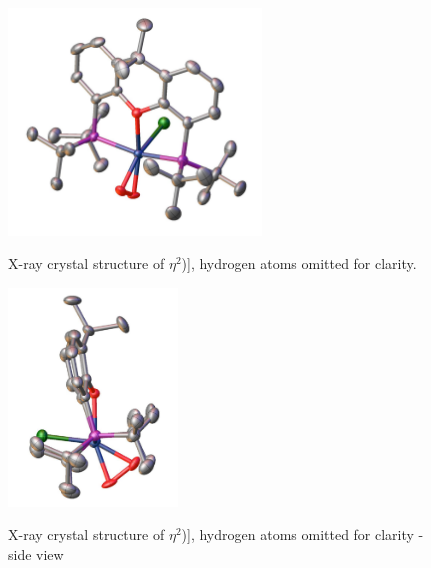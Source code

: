 \begin{figure}[htp]
\begin{center}
\vspace{0.5cm}
\includegraphics[width=0.6\textwidth]{../Figures/Crystalrhodium.pdf}
\caption[X-ray crystal structure of \ce{[Rh(tBu-xantphos)Cl(}$\eta^2$){]}]{X-ray crystal structure of \ce{[Rh(tBu-xantphos)Cl(}$\eta^2$)], hydrogen atoms omitted for clarity.}
\vspace{0.2cm}
\label{Crystal:rhodium}
\end{center}
\end{figure}
\vspace{0.2cm}

\begin{figure}[htp]
\begin{center}
\vspace{0.5cm}
\includegraphics[width=0.4\textwidth]{../Figures/Crystalrhodiumside.pdf}
\caption[X-ray crystal structure of \ce{[Rh(tBu-xantphos)Cl(}$\eta^2$){]} - side view]{X-ray crystal structure of \ce{[Rh(tBu-xantphos)Cl(}$\eta^2$)], hydrogen atoms omitted for clarity - side view}
\vspace{0.2cm}
\label{Crystal:rhodiumside}
\end{center}
\end{figure}
\vspace{0.2cm}

